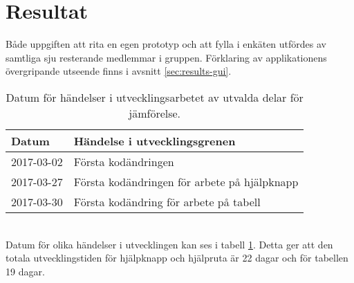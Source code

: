 \section{Resultat}
\label{cha:rebecca-results}
Både uppgiften att rita en egen prototyp och att fylla i enkäten utfördes av samtliga sju resterande medlemmar i gruppen. Förklaring av applikationens övergripande utseende finns i avsnitt \ref{sec:results-gui}.
\\
\begin{table}[h!] 
\caption{Datum för händelser i utvecklingsarbetet av utvalda delar för jämförelse.} 
\def\arraystretch{1.5} 
\begin{adjustbox}{max width=\textwidth} 
\begin{tabularx}{\textwidth}{| l | X |} 
\hline 
\textbf{Datum} & \textbf{Händelse i utvecklingsgrenen} \\ 
\hline 
2017-03-02 & Första kodändringen \\ 
\hline 
2017-03-27 & Första kodändringen för arbete på hjälpknapp\\ 
\hline 
2017-03-30 & Första kodändring för arbete på tabell \\ 
\hline 
\end{tabularx} 
\end{adjustbox} 
\label{tab:prototypes-events-date} 
\end{table}
\ \\
Datum för olika händelser i utvecklingen kan ses i tabell \ref{tab:prototypes-events-date}. Detta ger att den totala utvecklingstiden för hjälpknapp och hjälpruta är 22 dagar och för tabellen 19 dagar.

